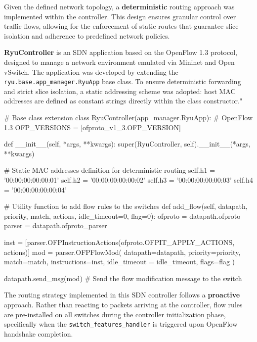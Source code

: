 \noindent
Given the defined network topology, a \textbf{deterministic} routing approach was implemented within the controller. This design ensures granular control over traffic flows, allowing for the enforcement of static routes that guarantee slice isolation and adherence to predefined network policies.

\textbf{RyuController} is an SDN application based on the OpenFlow 1.3 protocol, designed to manage a network environment emulated via Mininet and Open vSwitch. The application was developed by extending the \lstinline|ryu.base.app_manager.RyuApp| base class. To ensure deterministic forwarding and strict slice isolation, a static addressing scheme was adopted: host MAC addresses are defined as constant strings directly within the class constructor."

\begin{pythoncode}
# Base class extension
class RyuController(app_manager.RyuApp):
    # OpenFlow 1.3 
    OFP_VERSIONS = [ofproto_v1_3.OFP_VERSION]

    def __init__(self, *args, **kwargs):
        super(RyuController, self).__init__(*args, **kwargs)
        
        # Static MAC addresses definition for deterministic routing
        self.h1 = '00:00:00:00:00:01'
        self.h2 = '00:00:00:00:00:02'
        self.h3 = '00:00:00:00:00:03'
        self.h4 = '00:00:00:00:00:04'

    # Utility function to add flow rules to the switches
    def add_flow(self, datapath, priority, match, actions, idle_timeout=0, flag=0):
        ofproto = datapath.ofproto
        parser = datapath.ofproto_parser

        inst = [parser.OFPInstructionActions(ofproto.OFPIT_APPLY_ACTIONS, actions)]
        mod = parser.OFPFlowMod(
            datapath=datapath, priority=priority,
            match=match, instructions=inst,
            idle_timeout = idle_timeout, flags=flag
        )

        datapath.send_msg(mod) # Send the flow modification message to the switch
\end{pythoncode}


The routing strategy implemented in this SDN controller follows a \textbf{proactive} approach. Rather than reacting to packets arriving at the controller, flow rules are pre-installed on all switches during the controller initialization phase, specifically when the \lstinline|switch_features_handler| is triggered upon OpenFlow handshake completion.

